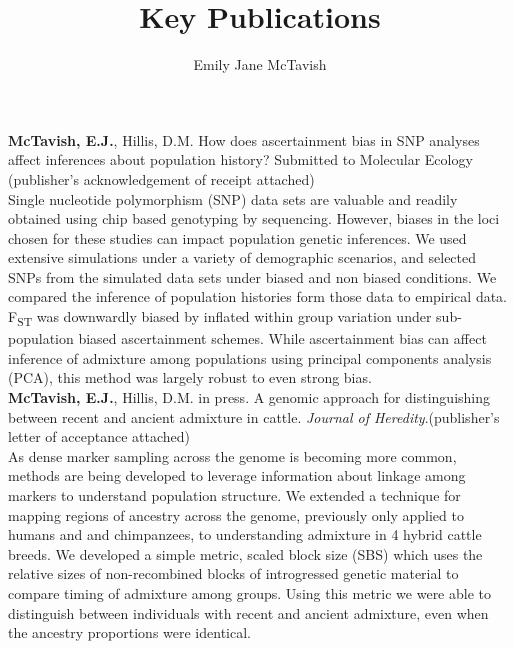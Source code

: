 \documentclass[10pt]{article}
\title{Key Publications}
\author{Emily Jane McTavish}
\date{}
\begin{document}
\maketitle

\textbf{McTavish, E.J.}, Hillis, D.M. How does ascertainment bias in SNP analyses affect inferences about population history? Submitted to Molecular Ecology (publisher’s acknowledgement of receipt attached)\\

Single nucleotide polymorphism (SNP) data sets are valuable and readily obtained using chip based genotyping by sequencing.
However, biases in the loci chosen for these studies can impact population genetic inferences. 
We used extensive simulations under a variety of demographic scenarios, and selected SNPs from the simulated data sets under biased and non biased conditions. 
We compared the inference of population histories form those data to empirical data. 
F\textsubscript{ST} was downwardly biased by inflated within group variation under sub-population biased ascertainment schemes. 
While ascertainment bias can affect inference of admixture among populations using principal components analysis (PCA), this method was largely robust to even strong bias.\\

\textbf{McTavish, E.J.}, Hillis, D.M. in press. A genomic approach for distinguishing between recent and ancient admixture in cattle.  \textsl{Journal of Heredity}.(publisher’s letter of acceptance attached)\\

As dense marker sampling across the genome is becoming more common, methods are being developed to leverage information about linkage among markers to understand population structure. 
We extended a technique for mapping regions of ancestry across the genome, previously only applied to humans and and chimpanzees, to understanding admixture in 4 hybrid cattle breeds. 
We developed a simple metric, scaled block size (SBS) which uses the relative sizes of non-recombined blocks of introgressed genetic material to compare timing of admixture among groups. 
Using this metric we were able to distinguish between individuals with recent and ancient admixture, even when the ancestry proportions were identical.\\
\end{document}
